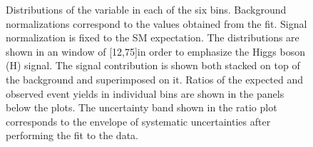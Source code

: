 \begin{figure}[htbp]
{}
\caption{Distributions of the \mt variable in each of the six \pth{} bins. Background normalizations correspond to the values obtained from the fit. Signal normalization is fixed to the SM expectation. The distributions are shown in an \mll window of [12,75]\GeV in order to emphasize the Higgs boson (H) signal. The signal contribution is shown both stacked on top of the background and superimposed on it. Ratios of the expected and observed event yields in individual bins are shown in the panels below the plots. The uncertainty band shown in the ratio plot corresponds to the envelope of systematic uncertainties after performing the fit to the data.}\label{fig:mTSignalRegion}
\end{figure}

